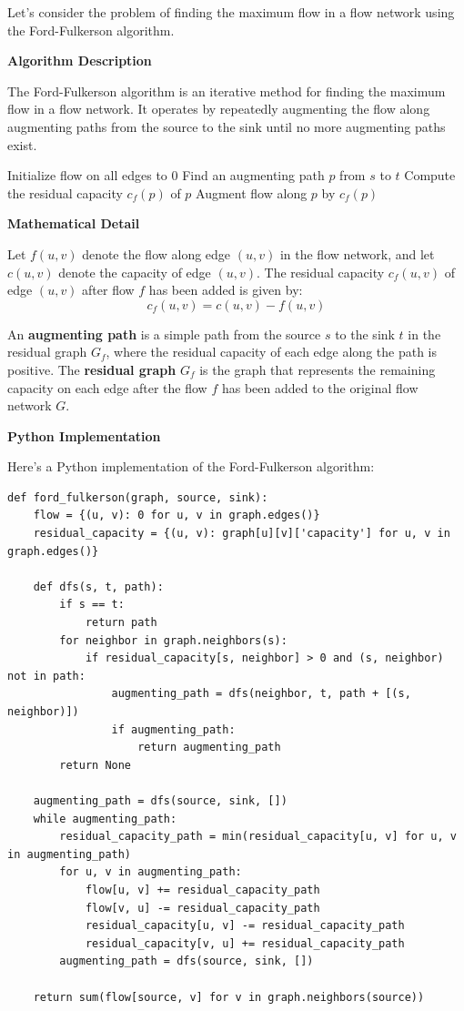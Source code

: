 \documentclass[12pt]{book} %
\begin{document}
Let's consider the problem of finding the maximum flow in a flow network using the Ford-Fulkerson algorithm.

\textbf{Algorithm Description}

The Ford-Fulkerson algorithm is an iterative method for finding the maximum flow in a flow network. It operates by repeatedly augmenting the flow along augmenting paths from the source to the sink until no more augmenting paths exist.
\FloatBarrier
\begin{algorithm}[H]
\caption{Ford-Fulkerson Algorithm}
\begin{algorithmic}[1]
\State Initialize flow on all edges to 0
    \State Find an augmenting path $p$ from $s$ to $t$
    \State Compute the residual capacity $c_f(p)$ of $p$
    \State Augment flow along $p$ by $c_f(p)$
\EndWhile
\end{algorithmic}
\end{algorithm}
\FloatBarrier
\textbf{Mathematical Detail}

Let \(f(u, v)\) denote the flow along edge \((u, v)\) in the flow network, and let \(c(u, v)\) denote the capacity of edge \((u, v)\). The residual capacity \(c_f(u, v)\) of edge \((u, v)\) after flow \(f\) has been added is given by:
\[ c_f(u, v) = c(u, v) - f(u, v) \]

An \textbf{augmenting path} is a simple path from the source \(s\) to the sink \(t\) in the residual graph \(G_f\), where the residual capacity of each edge along the path is positive. The \textbf{residual graph} \(G_f\) is the graph that represents the remaining capacity on each edge after the flow \(f\) has been added to the original flow network \(G\).

\textbf{Python Implementation}

Here's a Python implementation of the Ford-Fulkerson algorithm:
\FloatBarrier
\begin{lstlisting}
def ford_fulkerson(graph, source, sink):
    flow = {(u, v): 0 for u, v in graph.edges()}
    residual_capacity = {(u, v): graph[u][v]['capacity'] for u, v in graph.edges()}
    
    def dfs(s, t, path):
        if s == t:
            return path
        for neighbor in graph.neighbors(s):
            if residual_capacity[s, neighbor] > 0 and (s, neighbor) not in path:
                augmenting_path = dfs(neighbor, t, path + [(s, neighbor)])
                if augmenting_path:
                    return augmenting_path
        return None
    
    augmenting_path = dfs(source, sink, [])
    while augmenting_path:
        residual_capacity_path = min(residual_capacity[u, v] for u, v in augmenting_path)
        for u, v in augmenting_path:
            flow[u, v] += residual_capacity_path
            flow[v, u] -= residual_capacity_path
            residual_capacity[u, v] -= residual_capacity_path
            residual_capacity[v, u] += residual_capacity_path
        augmenting_path = dfs(source, sink, [])
    
    return sum(flow[source, v] for v in graph.neighbors(source))
\end{lstlisting}
\end{document}
